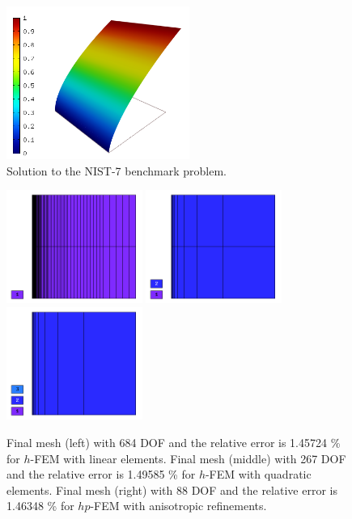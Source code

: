 \documentclass[12pt]{elsarticle}
\begin{document}
\begin{figure}[H]
\centering
\includegraphics[height=5cm]{nist/nist-7/solution.png}
\vspace{-3mm}
\caption{Solution to the NIST-7 benchmark problem.}
\label{fig:sln-nist07}
\end{figure}

\begin{figure}[H]
\centering
\vspace{-5mm}
\includegraphics[height=3.7cm]{nist/nist-7/mesh_h1_aniso.png}
\includegraphics[height=3.7cm]{nist/nist-7/mesh_h2_aniso.png}
\includegraphics[height=3.7cm]{nist/nist-7/mesh_hp_aniso.png}
\vspace{-3mm}
\caption{
Final mesh (left) with 684 DOF and the relative error is 1.45724 \% for $h$-FEM with linear elements.
Final mesh (middle) with 267 DOF and the relative error is 1.49585 \% for $h$-FEM with quadratic elements.
Final mesh (right) with 88 DOF and the relative error is 1.46348 \% for $hp$-FEM with anisotropic refinements.}
\vspace{-3mm}
\label{fig:nist-7-hp-aniso}
\end{figure}
\end{document}
